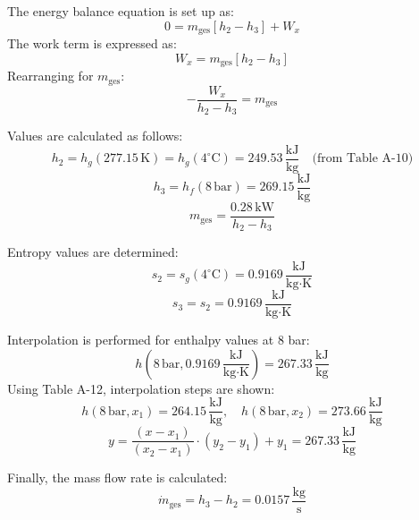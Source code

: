 The energy balance equation is set up as:  
\[
0 = m_{\text{ges}} \left[ h_2 - h_3 \right] + W_x
\]  
The work term is expressed as:  
\[
W_x = m_{\text{ges}} \left[ h_2 - h_3 \right]
\]  
Rearranging for \(m_{\text{ges}}\):  
\[
-\frac{W_x}{h_2 - h_3} = m_{\text{ges}}
\]  

Values are calculated as follows:  
\[
h_2 = h_g(277.15 \, \text{K}) = h_g(4^\circ\text{C}) = 249.53 \, \frac{\text{kJ}}{\text{kg}} \quad \text{(from Table A-10)}
\]  
\[
h_3 = h_f(8 \, \text{bar}) = 269.15 \, \frac{\text{kJ}}{\text{kg}}
\]  
\[
m_{\text{ges}} = \frac{0.28 \, \text{kW}}{h_2 - h_3}
\]  

Entropy values are determined:  
\[
s_2 = s_g(4^\circ\text{C}) = 0.9169 \, \frac{\text{kJ}}{\text{kg·K}}
\]  
\[
s_3 = s_2 = 0.9169 \, \frac{\text{kJ}}{\text{kg·K}}
\]  

Interpolation is performed for enthalpy values at 8 bar:  
\[
h(8 \, \text{bar}, 0.9169 \, \frac{\text{kJ}}{\text{kg·K}}) = 267.33 \, \frac{\text{kJ}}{\text{kg}}
\]  
Using Table A-12, interpolation steps are shown:  
\[
h(8 \, \text{bar}, x_1) = 264.15 \, \frac{\text{kJ}}{\text{kg}}, \quad h(8 \, \text{bar}, x_2) = 273.66 \, \frac{\text{kJ}}{\text{kg}}
\]  
\[
y = \frac{(x - x_1)}{(x_2 - x_1)} \cdot (y_2 - y_1) + y_1 = 267.33 \, \frac{\text{kJ}}{\text{kg}}
\]  

Finally, the mass flow rate is calculated:  
\[
\dot{m}_{\text{ges}} = h_3 - h_2 = 0.0157 \, \frac{\text{kg}}{\text{s}}
\]